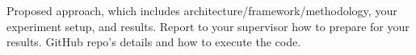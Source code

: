 Proposed approach, which includes architecture/framework/methodology,  your experiment setup, and results. Report to your supervisor how to prepare for your results. GitHub repo's details and how to execute the code. 